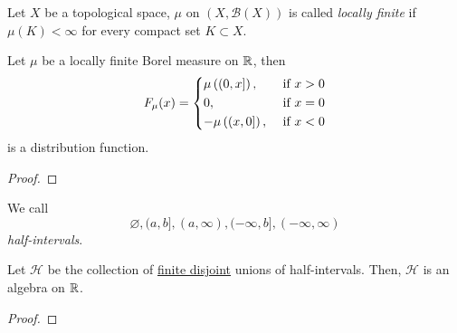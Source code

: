 \begin{definition}
	Let \(X\) be a topological space, \(\mu\) on \((X, \mathcal{B} (X))\) is called \emph{locally finite} if \(\mu (K)<\infty \)
	for every compact set \(K\subset X\).
\end{definition}

\begin{lemma}
	Let \(\mu \) be a locally finite Borel measure on \(\mathbb{\MakeUppercase{R}} \), then
	\[
		F_{\mu }(x) = \begin{dcases}
			\mu \left((0, x]\right),  & \text{ if } x > 0 \\
			0,                        & \text{ if } x = 0 \\
			-\mu \left((x, 0]\right), & \text{ if } x < 0
		\end{dcases}
	\]
	is a distribution function.
\end{lemma}
\begin{proof}
\end{proof}

\begin{definition}
	We call
	\[
		\varnothing , (a, b], (a, \infty ), (-\infty , b], (-\infty , \infty )
	\]
	\emph{half-intervals}.
\end{definition}

\begin{lemma}
	Let \(\mathcal{H} \) be the collection of \underline{finite disjoint} unions of half-intervals. Then, \(\mathcal{H} \)
	is an algebra on \(\mathbb{\MakeUppercase{R}} \).
\end{lemma}
\begin{proof}
\end{proof}

